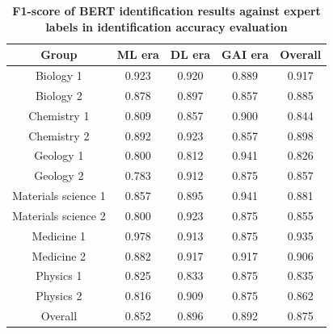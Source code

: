 \begin{table}[ht]
\caption{\textbf{F1-score of BERT identification results against expert labels in identification accuracy evaluation}}
\centering
\begin{tabular}{@{}c|ccc|c@{}}
\toprule
Group               & ML era & DL era & GAI era & Overall \\ \midrule
Biology 1           & 0.923  & 0.920  & 0.889   & 0.917   \\
Biology 2           & 0.878  & 0.897  & 0.857   & 0.885   \\
Chemistry 1         & 0.809  & 0.857  & 0.900   & 0.844   \\
Chemistry 2         & 0.892  & 0.923  & 0.857   & 0.898   \\
Geology 1           & 0.800  & 0.812  & 0.941   & 0.826   \\
Geology 2           & 0.783  & 0.912  & 0.875   & 0.857   \\
Materials science 1 & 0.857  & 0.895  & 0.941   & 0.881   \\
Materials science 2 & 0.800  & 0.923  & 0.875   & 0.855   \\
Medicine 1          & 0.978  & 0.913  & 0.875   & 0.935   \\
Medicine 2          & 0.882  & 0.917  & 0.917   & 0.906   \\
Physics 1           & 0.825  & 0.833  & 0.875   & 0.835   \\
Physics 2           & 0.816  & 0.909  & 0.875   & 0.862   \\ \midrule
Overall             & 0.852  & 0.896  & 0.892   & 0.875   \\ \bottomrule
\end{tabular}
\label{tab4}
\end{table}


